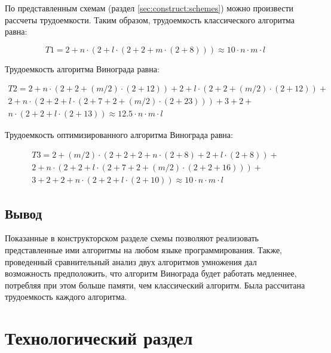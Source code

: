 \documentclass[12pt,a4paper]{scrartcl}
\begin{document}
 По представленным схемам (раздел \ref{sec:construct:schemes}) можно произвести рассчеты трудоемкости. 
 Таким образом, трудоемкость классического алгоритма равна:
 
 \begin{equation}\label{eq:t1}
 T1 = 2 + n \cdot (2 + l \cdot (2 + 2 + m \cdot (2 + 8) )) \approx 10 \cdot n \cdot m \cdot l
 \end{equation}
 
 Трудоемкость алгоритма Винограда равна:
 
 \begin{equation}\label{eq:t2}
 \begin{gathered}
 T2 = 2 + n \cdot (2 + 2 + (m/2) \cdot (2 + 12)) + 2 + l \cdot (2 + 2 + (m/2) \cdot (2 + 12)) +\\
 2 + n \cdot (2 + 2 + l \cdot (2 + 7 + 2 + (m/2) \cdot (2 + 23))) + 3 + 2 + \\
 n \cdot (2 + 2 + l \cdot (2 + 13)) \approx 12.5 \cdot n \cdot m \cdot l
 \end{gathered}
 \end{equation}
 
 Трудоемкость оптимизированного алгоритма Винограда равна:
 
 \begin{equation}\label{eq:t3}
 \begin{gathered}
 T3 = 2 + (m/2) \cdot (2 + 2 + 2 + n \cdot (2 + 8) + 2 + l \cdot (2 + 8)) +\\
 2 + n \cdot (2 + 2 + l \cdot (2 + 7 + 2 + (m/2) \cdot (2 + 2 + 16))) + \\
 3 + 2 + 2 + n \cdot (2 + 2 + l \cdot (2 + 10)) \approx 10 \cdot n \cdot m \cdot l
 \end{gathered}
 \end{equation}
	
	
	\subsection{Вывод}
	\label{sec:construct:conclusion}
	
	Показанные в конструкторском разделе схемы позволяют реализовать представленные ими алгоритмы на любом языке программирования. 
	Также, проведенный сравнительный анализ двух алгоритмов умножения дал возможность предположить, что алгоритм Винограда будет работать медленнее, потребляя при этом больше памяти, чем классический алгоритм.
	Была рассчитана трудоемкость каждого алгоритма.
	
	\newpage
	\section{Технологический раздел}
	\label{sec:tech}
	
\end{document}
